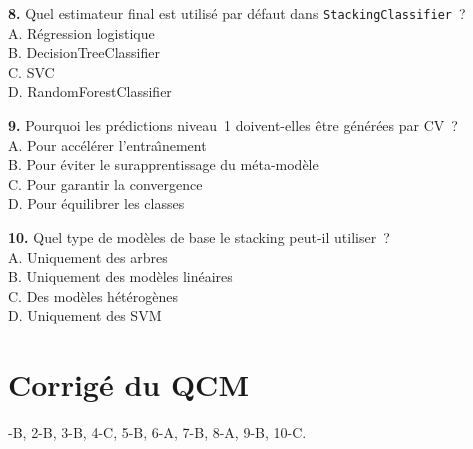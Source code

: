 \documentclass[a4paper,11pt]{article}
\theoremstyle{definition}
\theoremstyle{remark}
\begin{document}
\medskip
\noindent
\textbf{8.} Quel estimateur final est utilis\'e par d\'efaut dans
\texttt{StackingClassifier}~?\\
A. R\'egression logistique\\
B. DecisionTreeClassifier\\
C. SVC\\
D. RandomForestClassifier

\medskip
\noindent
\textbf{9.} Pourquoi les pr\'edictions niveau~1 doivent-elles \^etre
g\'en\'er\'ees par CV~?\\
A. Pour acc\'el\'erer l'entra\^\i nement\\
B. Pour \'eviter le surapprentissage du m\'eta-mod\`ele\\
C. Pour garantir la convergence\\
D. Pour \'equilibrer les classes

\medskip
\noindent
\textbf{10.} Quel type de mod\`eles de base le stacking
peut-il utiliser~?\\
A. Uniquement des arbres\\
B. Uniquement des mod\`eles lin\'eaires\\
C. Des mod\`eles h\'et\'erog\`enes\\
D. Uniquement des SVM

\newpage
\section*{Corrig\'e du QCM}

-B, 2-B, 3-B, 4-C, 5-B, 6-A, 7-B, 8-A, 9-B, 10-C.
\end{document}
